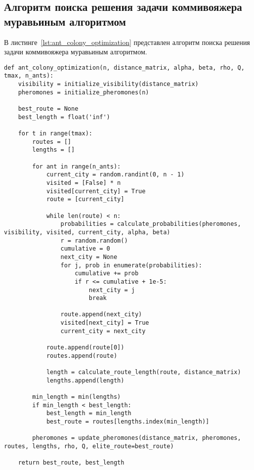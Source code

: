 \subsection{Алгоритм поиска решения задачи коммивояжера муравьиным алгоритмом}

В листинге~\ref{lst:ant_colony_optimization} представлен алгоритм поиска решения задачи коммивояжера муравьиным алгоритмом.
\begin{center}
\begin{lstlisting}[caption={Алгоритм поиска решения задачи коммивояжера муравьиным алгоритмом}, label={lst:ant_colony_optimization}]
def ant_colony_optimization(n, distance_matrix, alpha, beta, rho, Q, tmax, n_ants):
    visibility = initialize_visibility(distance_matrix)
    pheromones = initialize_pheromones(n)

    best_route = None
    best_length = float('inf')

    for t in range(tmax):
        routes = []
        lengths = []

        for ant in range(n_ants):
            current_city = random.randint(0, n - 1)
            visited = [False] * n
            visited[current_city] = True
            route = [current_city]

            while len(route) < n:
                probabilities = calculate_probabilities(pheromones, visibility, visited, current_city, alpha, beta)
                r = random.random()
                cumulative = 0
                next_city = None
                for j, prob in enumerate(probabilities):
                    cumulative += prob
                    if r <= cumulative + 1e-5:
                        next_city = j
                        break

                route.append(next_city)
                visited[next_city] = True
                current_city = next_city

            route.append(route[0])
            routes.append(route)

            length = calculate_route_length(route, distance_matrix)
            lengths.append(length)

        min_length = min(lengths)
        if min_length < best_length:
            best_length = min_length
            best_route = routes[lengths.index(min_length)]

        pheromones = update_pheromones(distance_matrix, pheromones, routes, lengths, rho, Q, elite_route=best_route)

    return best_route, best_length
\end{lstlisting}
\end{center}

